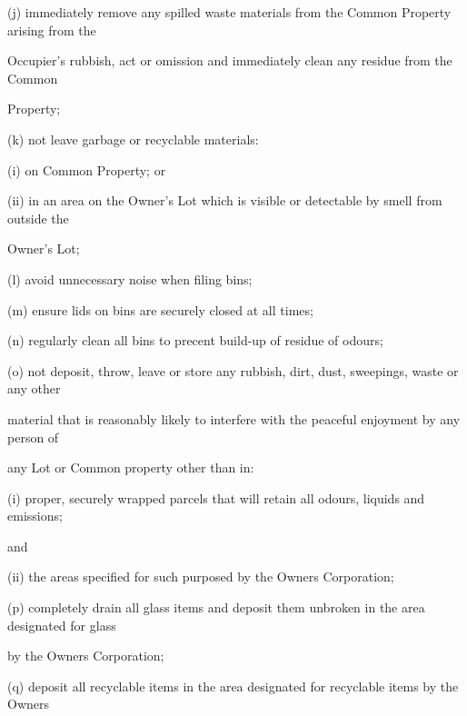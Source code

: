 \documentclass{article}
\begin{document}
{\fontsize{9.962}{1}(j) immediately remove any spilled waste materials from the Common Property arising from the }

{\fontsize{10.02}{1}Occupier’s rubbish, act or omission and immediately clean any residue from the Common }

{\fontsize{10.02}{1}Property; }

{\fontsize{9.962}{1}(k) not leave garbage or recyclable materials: }

{\fontsize{9.962}{1}(i) on Common Property; or }

{\fontsize{9.962}{1}(ii) in an area on the Owner’s Lot which is visible or detectable by smell from outside the }

{\fontsize{10.02}{1}Owner’s Lot; }

{\fontsize{9.962}{1}(l) avoid unnecessary noise when filing bins; }

{\fontsize{9.962}{1}(m) ensure lids on bins are securely closed at all times; }

{\fontsize{9.962}{1}(n) regularly clean all bins to precent build-up of residue of odours; }

{\fontsize{9.962}{1}(o) not deposit, throw, leave or store any rubbish, dirt, dust, sweepings, waste or any other }

{\fontsize{10.02}{1}material that is reasonably likely to interfere with the peaceful enjoyment by any person of }

{\fontsize{10.02}{1}any Lot or Common property other than in: }

{\fontsize{9.962}{1}(i) proper, securely wrapped parcels that will retain all odours, liquids and emissions; }

{\fontsize{10.02}{1}and }

\newpage


















{\fontsize{9.962}{1}(ii) the areas specified for such purposed by the Owners Corporation; }

{\fontsize{9.962}{1}(p) completely drain all glass items and deposit them unbroken in the area designated for glass }

{\fontsize{10.02}{1}by the Owners Corporation;  }

{\fontsize{9.962}{1}(q) deposit all recyclable items in the area designated for recyclable items by the Owners }
\end{document}
